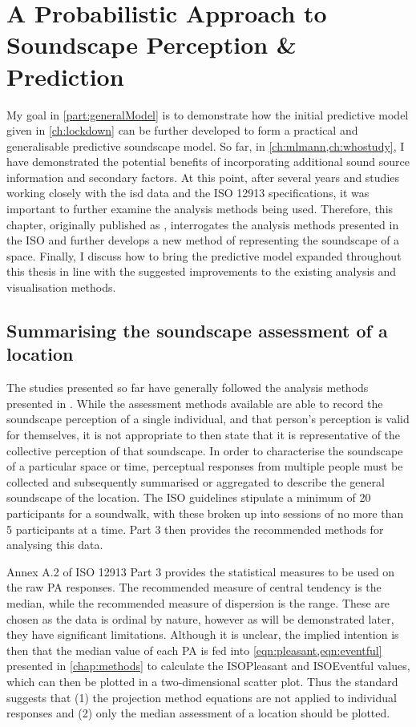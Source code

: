 \chapter{A Probabilistic Approach to Soundscape Perception \& Prediction}
\label{ch:ProbabilisticPOC}

My goal in \cref{part:generalModel} is to demonstrate how the initial predictive model given in \cref{ch:lockdown} can be further developed to form a practical and generalisable predictive soundscape model. So far, in \cref{ch:mlmann,ch:whostudy}, I have demonstrated the potential benefits of incorporating additional sound source information and secondary factors. At this point, after several years and studies working closely with the \gls{isd} data and the ISO 12913 specifications, it was important to further examine the analysis methods being used. Therefore, this chapter, originally published as \citet{Mitchell2022How}, interrogates the analysis methods presented in the ISO and further develops a new method of representing the soundscape of a space. Finally, I discuss how to bring the predictive model expanded throughout this thesis in line with the suggested improvements to the existing analysis and visualisation methods. 

\section{Summarising the soundscape assessment of a location}
The studies presented so far have generally followed the analysis methods presented in \citet{ISO12913Part3}. While the assessment methods available are able to record the soundscape perception of a single individual, and that person's perception is valid for themselves, it is not appropriate to then state that it is representative of the collective perception of that soundscape. In order to characterise the soundscape of a particular space or time, perceptual responses from multiple people must be collected and subsequently summarised or aggregated to describe the general soundscape of the location. The ISO guidelines stipulate a minimum of 20 participants for a soundwalk, with these broken up into sessions of no more than 5 participants at a time. Part 3 then provides the recommended methods for analysing this data.

Annex A.2 of ISO 12913 Part 3 provides the statistical measures to be used on the raw PA responses. The recommended measure of central tendency is the median, while the recommended measure of dispersion is the range. These are chosen as the data is ordinal by nature, however as will be demonstrated later, they have significant limitations. Although it is unclear, the implied intention is then that the median value of each PA is fed into \cref{eqn:pleasant,eqn:eventful} presented in \cref{chap:methods} to calculate the ISOPleasant and ISOEventful values, which can then be plotted in a two-dimensional scatter plot. Thus the standard suggests that (1) the projection method equations are not applied to individual responses and (2) only the median assessment of a location should be plotted.

